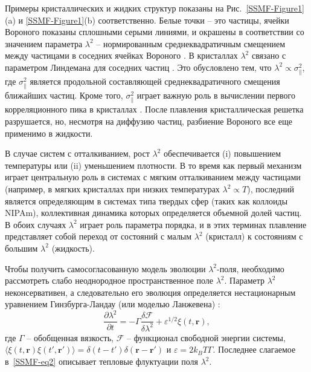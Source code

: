 
Примеры кристаллических и жидких структур показаны на Рис.~\ref{SSMF-Figure1}(a) и \ref{SSMF-Figure1}(b) соответственно.
Белые точки -- это частицы, ячейки Вороного показаны сплошными серыми линиями, и окрашены в соответствии со значением параметра $\lambda^2$ -- нормированным среднеквадратичным смещением между частицами в соседних ячейках Вороного \cite{10.1021/acs.jpcc.7b09317}. %
В кристаллах $\lambda^2$ связано с параметром Линдемана для соседних частиц \cite{10.1016/0375-9601(85)90617-6}.
Это обусловлено тем, что $\lambda^2\propto \sigma_ \| ^ 2 $, где $ \sigma_ \| ^ 2 $ является продольной составляющей среднеквадратичного смещения ближайших частиц.
Кроме того, $ \sigma_ \| ^ 2 $ играет важную роль в вычислении первого корреляционного пика в кристаллах \cite{10.1063/1.4869863, 10.1063/1.4926945, 10.1088/0953-8984/28/23/235401, 10.1039/c7sm02429k, 10.1063/1.5116176}.
После плавления кристаллическая решетка разрушается, но, несмотря на диффузию частиц, разбиение Вороного все еще применимо в жидкости.

В случае систем с отталкиванием, рост $\lambda^2$ обеспечивается (i) повышением температуры или (ii) уменьшением плотности.
В то время как первый механизм играет центральную роль в системах с мягким отталкиванием между частицами (например, в мягких кристаллах при низких температурах $\lambda^2\propto T $), последний является определяющим в системах типа твердых сфер (таких как коллоиды NIPAm), коллективная динамика которых определяется объемной долей частиц.
В обоих случаях $\lambda^2$ играет роль параметра порядка, и в этих терминах плавление представляет собой переход от состояний с малым $\lambda^2$ (кристалл) к состояниям с большим $\lambda^2$ (жидкость).

Чтобы получить самосогласованную модель эволюции $ \lambda^2$-поля,
необходимо рассмотреть слабо неоднородное пространственное поле $\lambda^2$.
Параметр $\lambda ^ 2$ неконсервативен, а следовательно его эволюция определяется нестационарным уравнением Гинзбурга-Ландау (или моделью Ланжевена) \cite{book.desai}:
\begin{equation}
\label{SSMF-eq4}
\frac{\partial \lambda^2}{\partial t} = -\Gamma \frac{\delta \mathcal{F}}{\delta \lambda^2} + \varepsilon^{1/2}\xi(t,\mathbf{r}),
\end{equation}
где $\Gamma$ -- обобщенная вязкость, $ \mathcal{F} $ -- функционал свободной энергии системы, $\langle \xi(t,\mathbf{r})\xi(t',\mathbf{r}')\rangle = \delta(t-t')\delta(\mathbf{r}-\mathbf{r}')$ и $\varepsilon = 2k_BT\Gamma$.
Последнее слагаемое в~\eqref{SSMF-eq2} описывает тепловые флуктуации поля $\lambda^2$.


